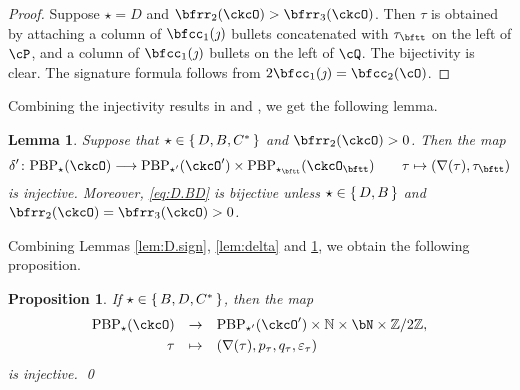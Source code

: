 \documentclass[12pt,a4paper]{amsart}
\newcommand{\BN}{{\mathbb {N}}}
\newcommand{\Z}{\mathbb{Z}}
\def\DD{\nabla}
\numberwithin{equation}{section}
\newtheorem{lem}[thm]{Lemma}
\newtheorem{prop}[thm]{Proposition}
\theoremstyle{remark}
\def\PBPes{\mathrm{PBP}^{\mathrm{ext}}_{\star}}
\def\PBPesp{\mathrm{PBP}^{\mathrm{ext}}_{\star'}}
\def\ckcOp{\ckcO^{\prime}}
\def\PBP{\mathrm{PBP}}
\begin{document}
\begin{proof}
{  Suppose $\star =  D$ and $\bfrr_{2}(\ckcO)>\bfrr_{3}(\ckcO)$.
  Then $\tau$ is obtained by attaching a column of $\bfcc_{1}(\jmath)$
  bullets concatenated with $\tau_{\bftt}$ on the left of $\cP$, and a column of  $\bfcc_{1}(\jmath)$
  bullets on the left of $\cQ$. The bijectivity is clear. The
  signature formula follows from $2\bfcc_{1}(\jmath)  = \bfcc_{2}(\cO)$.

}
\end{proof}

Combining the injectivity results in  and
, we get the following lemma.
\begin{lem}\label{cor:D.inj1}
Suppose that $\star \in \set{D,B,C^*}$ and $\bfrr_{2}(\ckcO)>0$.
Then the map
\begin{equation}\label{eq:D.BD}
  \delta' \colon \PBP_{\star}(\ckcO)\longrightarrow
   \PBP_{\star'}(\ckcOp)\times \PBP_{\star_\bftt}(\ckcO_\bftt)
   \qquad \tau \mapsto (\DD(\tau), \tau_\bftt)
\end{equation}
is injective. Moreover, \eqref{eq:D.BD} is bijective
unless $\star\in \set{D,B}$ and $\bfrr_2(\ckcO)=\bfrr_3(\ckcO)>0$.
\end{lem}

Combining Lemmas \ref{lem:D.sign}, \ref{lem:delta} and \ref{cor:D.inj1}, we obtain the following proposition.
\begin{prop}\label{cor:dpinj}
If $\star \in \set{B, D,C^*}$, then the map
\begin{equation}
  \begin{array}{rcl}
   \PBP_{\star}(\ckcO)&\rightarrow&
   \PBP_{\star'}(\ckcOp)\times \BN\times \bN\times \Z/2\Z, \smallskip\\
   \tau& \mapsto & (\DD(\tau), p_\tau, q_\tau, \varepsilon_\tau)
   \end{array}
\end{equation}
is injective. \qed
\end{prop}
\end{document}
